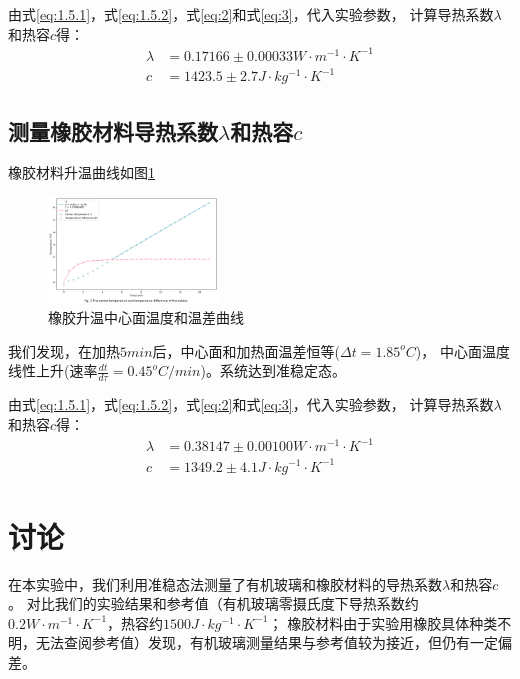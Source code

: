 \documentclass[10pt,a4paper,twocolumn,twoside,UTF8]{ctexart}
\begin{document}
	由式\ref{eq:1.5.1}，式\ref{eq:1.5.2}，式\ref{eq:2}和式\ref{eq:3}，代入实验参数，
	计算导热系数$\lambda$和热容$c$得：
	\begin{align}
		\lambda &= 0.17166 \pm 0.00033 W \cdot m^{-1} \cdot K^{-1} \\
		c &= 1423.5 \pm 2.7 J \cdot kg^{-1} \cdot K^{-1}
	\end{align}

	\subsection{测量橡胶材料导热系数$\lambda$和热容$c$}

	橡胶材料升温曲线如图\ref{fig:2}
	\begin{figure}[htbp]
		\centering
		\includegraphics[width=0.4\textwidth]{attachments/fig.2.png}
		\caption{橡胶升温中心面温度和温差曲线}
		\label{fig:2}
	\end{figure}	

	我们发现，在加热$5min$后，中心面和加热面温差恒等($\Delta t = 1.85 ^oC$)，
	中心面温度线性上升(速率$\frac{dt}{d\tau} = 0.45 ^oC/min$)。系统达到准稳定态。

	由式\ref{eq:1.5.1}，式\ref{eq:1.5.2}，式\ref{eq:2}和式\ref{eq:3}，代入实验参数，
	计算导热系数$\lambda$和热容$c$得：
	\begin{align}
		\lambda &= 0.38147 \pm 0.00100 W \cdot m^{-1} \cdot K^{-1} \\
		c &= 1349.2 \pm 4.1 J \cdot kg^{-1} \cdot K^{-1}
	\end{align}

\section{讨论}
在本实验中，我们利用准稳态法测量了有机玻璃和橡胶材料的导热系数$\lambda$和热容$c$。
对比我们的实验结果和参考值（有机玻璃零摄氏度下导热系数约$0.2W \cdot m^{-1} \cdot K^{-1}$，热容约$1500 J \cdot kg^{-1} \cdot K^{-1}$；
橡胶材料由于实验用橡胶具体种类不明，无法查阅参考值）发现，有机玻璃测量结果与参考值较为接近，但仍有一定偏差。
\end{document}
